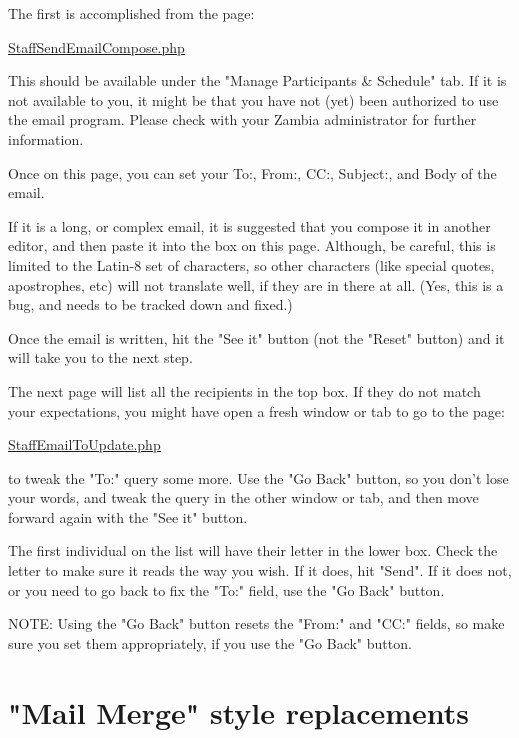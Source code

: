 \documentclass[captions=tablesignature]{scrartcl}
\begin{document}
The first is accomplished from the page:

\label{StaffSendEmailCompose.php}
\underline{
\href{../webpages/StaffSendEmailCompose.php}{StaffSendEmailCompose.php}
}

This should be available under the "Manage Participants \& Schedule"
tab.  If it is not available to you, it might be that you have not
(yet) been authorized to use the email program.  Please check with
your Zambia administrator for further information.

Once on this page, you can set your To:, From:, CC:, Subject:, and
Body of the email.

If it is a long, or complex email, it is suggested that you compose
it in another editor, and then paste it into the box on this page.
Although, be careful, this is limited to the Latin-8 set of
characters, so other characters (like special quotes, apostrophes,
etc) will not translate well, if they are in there at all.  (Yes,
this is a bug, and needs to be tracked down and fixed.)

Once the email is written, hit the "See it" button (not the "Reset"
button) and it will take you to the next step.

The next page will list all the recipients in the top box.  If
they do not match your expectations, you might have open a fresh
window or tab to go to the page:

\label{StaffEmailToUpdate.php}
\underline{
\href{../webpages/StaffEmailToUpdate.php}{StaffEmailToUpdate.php}
}

to tweak the "To:" query some more.  Use the "Go Back" button, so
you don't lose your words, and tweak the query in the other window
or tab, and then move forward again with the "See it" button.

The first individual on the list will have their letter in the lower
box.  Check the letter to make sure it reads the way you wish.  If
it does, hit "Send".  If it does not, or you need to go back to fix
the "To:" field, use the "Go Back" button.

NOTE: Using the "Go Back" button resets the "From:" and "CC:"
fields, so make sure you set them appropriately, if you use the "Go
Back" button.

\section{"Mail Merge" style replacements}
\label{sec-6}
\end{document}
